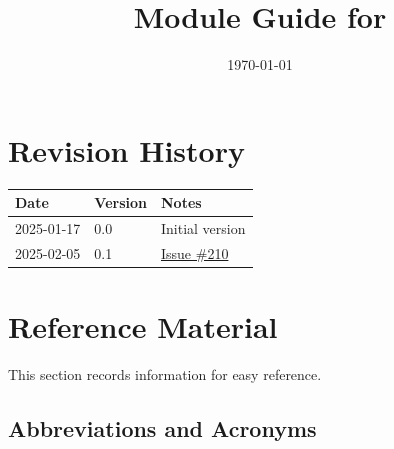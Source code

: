 \documentclass[12pt, titlepage]{article}
\begin{document}
\title{Module Guide for \progname{}} 
\author{\authname}
\date{\today}

\maketitle


\section{Revision History}

\begin{tabularx}{\textwidth}{p{3cm}p{2cm}X}
\toprule {\bf Date} & {\bf Version} & {\bf Notes}\\
\midrule
2025-01-17 & 0.0 & Initial version\\
2025-02-05 & 0.1 & \href{https://github.com/emilyperica/ScoreGen/issues/210}{Issue \#210}\\
\bottomrule
\end{tabularx}

\newpage

\section{Reference Material}

This section records information for easy reference.

\subsection{Abbreviations and Acronyms}
\end{document}
